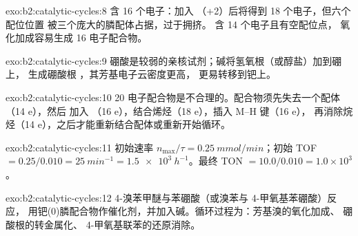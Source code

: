 \begin{solution}{exo:b2:catalytic-cycles:8}
 含 16 个电子：加入 （+2）后将得到 18 个电子，但六个配位位置
被三个庞大的膦配体占据，过于拥挤。 含 14 个电子且有空配位点，
氧化加成容易生成 16 电子配合物。
\end{solution}

\begin{solution}{exo:b2:catalytic-cycles:9}
硼酸是较弱的亲核试剂；碱将氢氧根（或醇盐）加到硼上，
生成硼酸根 ，其芳基电子云密度更高，
更易转移到钯上。
\end{solution}

\begin{solution}{exo:b2:catalytic-cycles:10}
20 电子配合物是不合理的。配合物须先失去一个配体（14 e），然后
加入 （16 e），结合烯烃（18 e），插入 M--H 键（16 e），
再消除烷烃（14 e），之后才能重新结合配体或重新开始循环。
\end{solution}

\begin{solution}{exo:b2:catalytic-cycles:11}
初始速率 $n_{\max}/\tau = \qty{0.25}{mmol/min}$；初始 TOF $= 0.25/0.010 =
\qty{25}{min^{-1}} = \qty{1.5e3}{h^{-1}}$。最终 TON $= 10.0/0.010 = 1.0 \times 10^3$。
\end{solution}

\begin{solution}{exo:b2:catalytic-cycles:12}
4-溴苯甲醚与苯硼酸（或溴苯与 4-甲氧基苯硼酸）反应，
用钯(0)膦配合物作催化剂，并加入碱。循环过程为：芳基溴的氧化加成、
硼酸根的转金属化、
4-甲氧基联苯的还原消除。
\end{solution}

